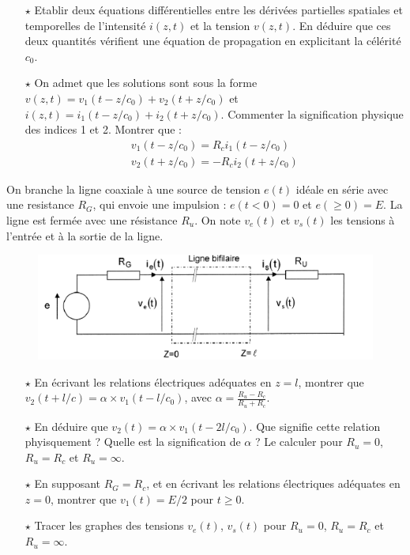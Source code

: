 \documentclass{report}
\begin{document}
\begin{itemize}

	\item[$\star$] Etablir deux équations différentielles entre les dérivées partielles spatiales et temporelles de l'intensité $i(z,t)$ et la tension $v(z,t)$. En déduire que ces deux quantités vérifient une équation de propagation en explicitant la célérité $c_0$.
	
	\item[$\star$] On admet que les solutions sont sous la forme $v(z,t)=v_1(t-z/c_0)+v_2(t+z/c_0)$ et $i(z,t)=i_1(t-z/c_0)+i_2(t+z/c_0)$. Commenter la signification physique des indices 1 et 2. Montrer que :
	\begin{align*}
		v_1(t-z/c_0)=R_ci_1(t-z/c_0) \\
		v_2(t+z/c_0)=-R_ci_2(t+z/c_0)
	\end{align*}

\end{itemize}

On branche la ligne coaxiale à une source de tension $e(t)$ idéale en série avec une resistance $R_G$, qui envoie une impulsion : $e(t<0)=0$ et $e(\geq0)=E$. La ligne est fermée avec une résistance $R_u$. On note $v_e(t)$ et $v_s(t)$ les tensions à l'entrée et à la sortie de la ligne.

\begin{figure}[h!]
\centering
	\includegraphics[scale=0.5]{coax.png}
\end{figure}

\begin{itemize}

	\item[$\star$] En écrivant les relations électriques adéquates en $z=l$, montrer que $v_2(t+l/c)=\alpha\times v_1(t-l/c_0)$, avec $\alpha=\frac{R_u-R_c}{R_u+R_c}$.
	
	\item[$\star$] En déduire que $v_2(t)=\alpha\times v_1(t-2l/c_0)$. Que signifie cette relation phyisquement ? Quelle est la signification de $\alpha$ ? Le calculer pour $R_u=0$, $R_u=R_c$ et $R_u=\infty$.
	
	\item[$\star$] En supposant $R_G=R_c$, et en écrivant les relations électriques adéquates en $z=0$, montrer que $v_1(t)=E/2$ pour $t\geq0$.

	\item[$\star$] Tracer les graphes des tensions $v_e(t)$, $v_s(t)$ pour $R_u=0$, $R_u=R_c$ et $R_u=\infty$.

\end{itemize}
\end{document}
